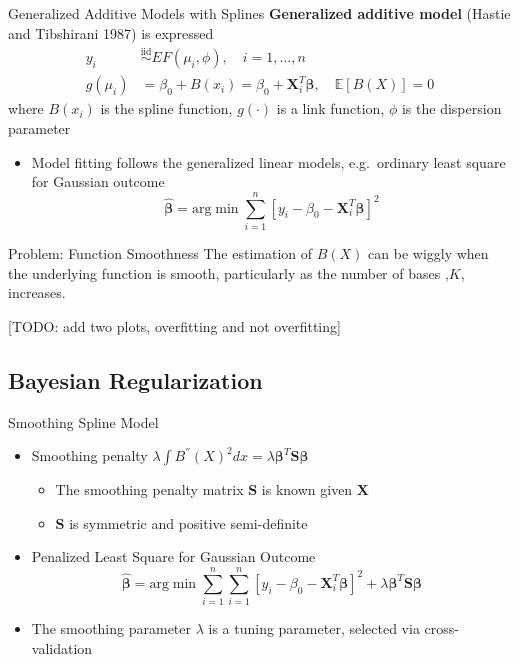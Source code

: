 \documentclass[
  ignorenonframetext,
  aspectratio=169]{beamer}
\providecommand{\tightlist}{%
  \setlength{\itemsep}{0pt}\setlength{\parskip}{0pt}}
\newcommand{\bs}[1]{\boldsymbol{#1}}
\newcommand{\simiid}{\overset{\text{iid}}{\sim}}
\begin{document}
\begin{frame}{Generalized Additive Models with Splines}
\protect\hypertarget{generalized-additive-models-with-splines}{}
\textbf{Generalized additive model} (Hastie and Tibshirani 1987) is
expressed \begin{align*}
  y_i &\simiid EF(\mu_i, \phi), \quad i = 1, \dots, n\\
  g(\mu_i) &= \beta_0 + B(x_i) = \beta_0 + \bs X_i^T \bs \beta ,  \quad \mathbb{E}\left[B(X)\right] = 0 
\end{align*} where \(B(x_i)\) is the spline function, \(g(\cdot)\) is a
link function, \(\phi\) is the dispersion parameter

\vspace*{0.5cm}

\begin{itemize}
\tightlist
\item
  Model fitting follows the generalized linear models, e.g.~ordinary
  least square for Gaussian outcome \[
  \boldsymbol{\hat \beta} = \text{arg}\min \sum\limits^n_{i=1} \left[y_i - \beta_0 - \bs X_i^T \bs \beta \right]^2
  \]
\end{itemize}
\end{frame}

\begin{frame}{Problem: Function Smoothness}
\protect\hypertarget{problem-function-smoothness}{}
The estimation of \(B(X)\) can be wiggly when the underlying function is
smooth, particularly as the number of bases ,\(K\), increases.

{[}TODO: add two plots, overfitting and not overfitting{]}
\end{frame}

\hypertarget{bayesian-regularization}{%
\subsection{Bayesian Regularization}\label{bayesian-regularization}}

\begin{frame}{Smoothing Spline Model}
\protect\hypertarget{smoothing-spline-model}{}
\begin{itemize}
\item
  Smoothing penalty
  \(\lambda \int B^{''}(X)^2dx = \lambda \bs \beta^T \bs S \bs\beta\)

  \begin{itemize}
  \tightlist
  \item
    The smoothing penalty matrix \(\bs S\) is known given \(\bs X\)
  \item
    \(\bs S\) is symmetric and positive semi-definite
  \end{itemize}
\item
  Penalized Least Square for Gaussian Outcome \[
  \boldsymbol{\hat \beta} = \text{arg}\min \sum\limits^n_{i=1} \sum\limits^n_{i=1} \left[y_i - \beta_0 - \bs X_i^T \bs \beta \right]^2 + \lambda \bs \beta^T \bs S \bs\beta
  \]
\item
  The smoothing parameter \(\lambda\) is a tuning parameter, selected
  via cross-validation
\end{itemize}
\end{frame}
\end{document}
